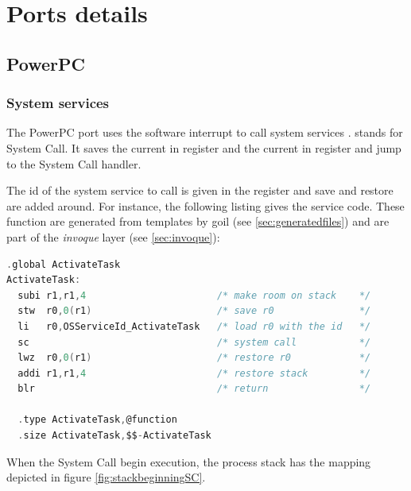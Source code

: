 
\chapter{Ports details}

\section{PowerPC}
\label{sec:ppcport}
\subsection{System services} \label{sec:systemservices}

The PowerPC port uses the  software interrupt to call system services \cite{mpc32bsc}.  stands for System Call. It saves the current  in  register and the current  in  register and jump to the System Call handler.

The id of the system service to call is given in the  register and  save and restore are added around. For instance, the following listing gives the  service code. These function are generated from templates by goil (see \ref{sec:generatedfiles}) and are part of the {\em invoque} layer (see \ref{sec:invoque}):

\begin{lstlisting}[language=C]
  .global ActivateTask
ActivateTask:
  subi r1,r1,4                       /* make room on stack    */
  stw  r0,0(r1)                      /* save r0               */
  li   r0,OSServiceId_ActivateTask   /* load r0 with the id   */
  sc                                 /* system call           */
  lwz  r0,0(r1)                      /* restore r0            */
  addi r1,r1,4                       /* restore stack         */
  blr                                /* return                */
  
  .type ActivateTask,@function
  .size ActivateTask,$$-ActivateTask
\end{lstlisting}

When the System Call begin execution, the process stack has the mapping depicted in figure \ref{fig:stackbeginningSC}.

